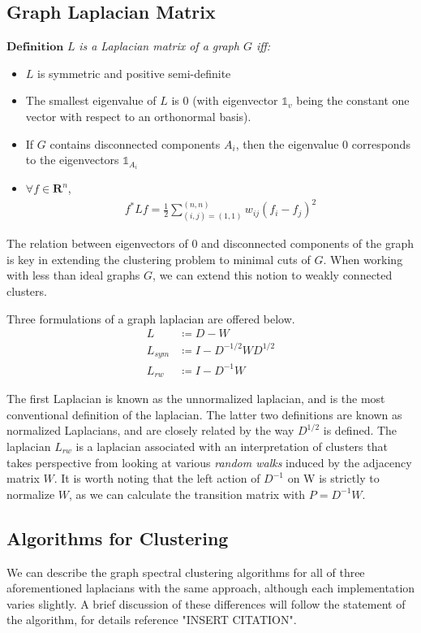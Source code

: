\documentclass[letterpaper,12pt]{article}
\begin{document}
\subsection{Graph Laplacian Matrix}
\vspace{5mm}
\noindent
$\textbf{Definition}$ $L$ \textit{is a Laplacian matrix of a graph $G$ iff:}
\begin{itemize}
    \item $L$ is symmetric and positive semi-definite
    \item The smallest eigenvalue of $L$ is 0 (with eigenvector $\mathds{1}_v$ being the constant one vector with respect to an orthonormal basis).
    \item If $G$ contains disconnected components $A_i$, then the eigenvalue 0 corresponds to the eigenvectors $\mathds{1}_{A_i}$
    \item $\forall f \in \mathbf{R}^{n}$,
    \begin{align}
        f^{*} L f = \frac{1}{2} \sum_{(i,j)=(1,1)}^{(n,n)} w_{ij} (f_i - f_j)^2
    \end{align}
\end{itemize}

\noindent
The relation between eigenvectors of 0 and disconnected components of the graph is key in extending the clustering problem to minimal cuts of $G$. When working with less than ideal graphs $G$, we can extend this notion to weakly connected clusters.

\noindent
Three formulations of a graph laplacian are offered below.
\begin{align}
    L  &\coloneqq D - W \\
    L_{sym} &\coloneqq I - D^{-1/2}WD^{1/2} \\
    L_{rw} &\coloneqq  I - D^{-1}W
\end{align}

\noindent
The first Laplacian is known as the unnormalized laplacian, and is the most conventional definition of the laplacian. The latter two definitions are known as normalized Laplacians, and are closely related by the way $D^{1/2}$ is defined. The laplacian $L_{rw}$ is a laplacian associated with an interpretation of clusters that takes perspective from looking at various \textit{random walks} induced by the adjacency matrix $W$. It is worth noting that the left action of $D^{-1}$ on W is strictly to normalize $W$, as we can calculate the transition matrix with $P=D^{-1}W$.

\subsection{Algorithms for Clustering}
We can describe the graph spectral clustering algorithms for all of three aforementioned laplacians with the same approach, although each implementation varies slightly. A brief discussion of these differences will follow the statement of the algorithm, for details reference "INSERT CITATION".
\end{document}

